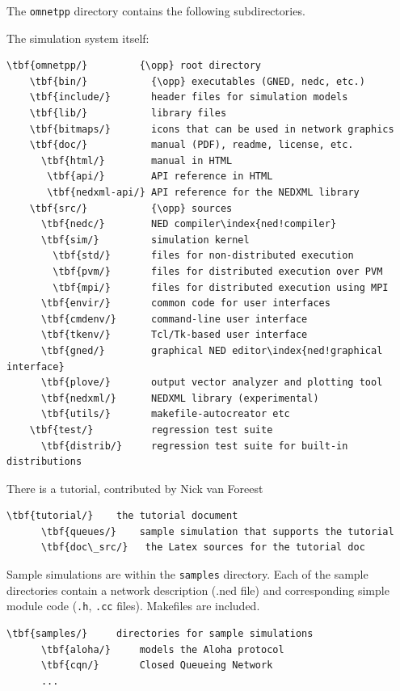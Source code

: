 The \texttt{omnetpp} directory contains the following subdirectories.

The simulation system itself:

\begin{Verbatim}[commandchars=\\\{\}]
  \tbf{omnetpp/}         {\opp} root directory
    \tbf{bin/}           {\opp} executables (GNED, nedc, etc.)
    \tbf{include/}       header files for simulation models
    \tbf{lib/}           library files
    \tbf{bitmaps/}       icons that can be used in network graphics
    \tbf{doc/}           manual (PDF), readme, license, etc.
      \tbf{html/}        manual in HTML
       \tbf{api/}        API reference in HTML
       \tbf{nedxml-api/} API reference for the NEDXML library
    \tbf{src/}           {\opp} sources
      \tbf{nedc/}        NED compiler\index{ned!compiler}
      \tbf{sim/}         simulation kernel
        \tbf{std/}       files for non-distributed execution
        \tbf{pvm/}       files for distributed execution over PVM
        \tbf{mpi/}       files for distributed execution using MPI
      \tbf{envir/}       common code for user interfaces
      \tbf{cmdenv/}      command-line user interface
      \tbf{tkenv/}       Tcl/Tk-based user interface
      \tbf{gned/}        graphical NED editor\index{ned!graphical interface}
      \tbf{plove/}       output vector analyzer and plotting tool
      \tbf{nedxml/}      NEDXML library (experimental)
      \tbf{utils/}       makefile-autocreator etc
    \tbf{test/}          regression test suite
      \tbf{distrib/}     regression test suite for built-in distributions
\end{Verbatim}

There is a tutorial, contributed by Nick van Foreest

\begin{Verbatim}[commandchars=\\\{\}]
    \tbf{tutorial/}    the tutorial document
      \tbf{queues/}    sample simulation that supports the tutorial
      \tbf{doc\_src/}   the Latex sources for the tutorial doc
\end{Verbatim}

Sample simulations are within the \texttt{samples} directory. Each of the
sample directories contain a network description (.ned file) and
corresponding simple module code (\texttt{.h}, \texttt{.cc} files).
Makefiles are included.

\begin{Verbatim}[commandchars=\\\{\}]
    \tbf{samples/}     directories for sample simulations
      \tbf{aloha/}     models the Aloha protocol
      \tbf{cqn/}       Closed Queueing Network
      ...
\end{Verbatim}


